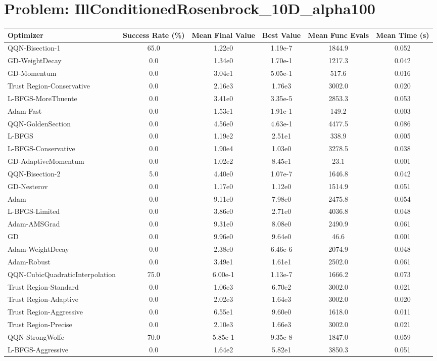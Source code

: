 \documentclass{article}
\begin{document}
\section{Problem: IllConditionedRosenbrock\_10D\_alpha100}
\begin{longtable}{p{3cm}*{5}{c}}
\toprule
\textbf{Optimizer} & \textbf{Success Rate (\%)} & \textbf{Mean Final Value} & \textbf{Best Value} & \textbf{Mean Func Evals} & \textbf{Mean Time (s)} \\
\midrule
QQN-Bisection-1 & 65.0 & 1.22e0 & 1.19e-7 & 1844.9 & 0.052 \\
GD-WeightDecay & 0.0 & 1.34e0 & 1.70e-1 & 1217.3 & 0.042 \\
GD-Momentum & 0.0 & 3.04e1 & 5.05e-1 & 517.6 & 0.016 \\
Trust Region-Conservative & 0.0 & 2.16e3 & 1.76e3 & 3002.0 & 0.020 \\
L-BFGS-MoreThuente & 0.0 & 3.41e0 & 3.35e-5 & 2853.3 & 0.053 \\
Adam-Fast & 0.0 & 1.53e1 & 1.91e-1 & 149.2 & 0.003 \\
QQN-GoldenSection & 0.0 & 4.56e0 & 4.63e-1 & 4477.5 & 0.086 \\
L-BFGS & 0.0 & 1.19e2 & 2.51e1 & 338.9 & 0.005 \\
L-BFGS-Conservative & 0.0 & 1.90e4 & 1.03e0 & 3278.5 & 0.038 \\
GD-AdaptiveMomentum & 0.0 & 1.02e2 & 8.45e1 & 23.1 & 0.001 \\
QQN-Bisection-2 & 5.0 & 4.40e0 & 1.07e-7 & 1646.8 & 0.042 \\
GD-Nesterov & 0.0 & 1.17e0 & 1.12e0 & 1514.9 & 0.051 \\
Adam & 0.0 & 9.11e0 & 7.98e0 & 2475.8 & 0.054 \\
L-BFGS-Limited & 0.0 & 3.86e0 & 2.71e0 & 4036.8 & 0.048 \\
Adam-AMSGrad & 0.0 & 9.31e0 & 8.08e0 & 2490.9 & 0.061 \\
GD & 0.0 & 9.96e0 & 9.64e0 & 46.6 & 0.001 \\
Adam-WeightDecay & 0.0 & 2.38e0 & 6.46e-6 & 2074.9 & 0.048 \\
Adam-Robust & 0.0 & 3.49e1 & 1.61e1 & 2502.0 & 0.061 \\
QQN-CubicQuadraticInterpolation & 75.0 & 6.00e-1 & 1.13e-7 & 1666.2 & 0.073 \\
Trust Region-Standard & 0.0 & 1.06e3 & 6.70e2 & 3002.0 & 0.021 \\
Trust Region-Adaptive & 0.0 & 2.02e3 & 1.64e3 & 3002.0 & 0.020 \\
Trust Region-Aggressive & 0.0 & 6.55e1 & 9.60e0 & 1618.0 & 0.011 \\
Trust Region-Precise & 0.0 & 2.10e3 & 1.66e3 & 3002.0 & 0.021 \\
QQN-StrongWolfe & 70.0 & 5.85e-1 & 9.35e-8 & 1847.0 & 0.059 \\
L-BFGS-Aggressive & 0.0 & 1.64e2 & 5.82e1 & 3850.3 & 0.051 \\
\bottomrule
\end{longtable}
\end{document}
